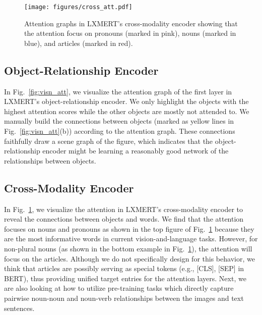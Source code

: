 \documentclass[11pt,a4paper]{article}
\begin{document}
\begin{figure}[t]
\centering
\texttt{[image: figures/cross\_att.pdf]}
\caption{
Attention graphs in LXMERT's cross-modality encoder showing that the attention focus on pronouns (marked in pink), nouns (marked in blue), and articles (marked in red). 
}
\vspace{-5pt}
\label{fig:cross_att}
\end{figure}

\subsection{Object-Relationship Encoder}
In Fig.~\ref{fig:visn_att}, we visualize the attention graph of the first layer in LXMERT's object-relationship encoder. 
We only highlight the objects with the highest attention scores while the other objects are mostly not attended to.
We manually build the connections between objects (marked as yellow lines in Fig.~\ref{fig:visn_att}(b)) according to the attention graph.
These connections faithfully draw a scene graph of the figure, which indicates that the object-relationship encoder might be learning a reasonably good network of the relationships between objects.

\subsection{Cross-Modality Encoder}
In Fig.~\ref{fig:cross_att}, we visualize the attention in LXMERT's cross-modality encoder to reveal the connections between objects and words. 
We find that the attention focuses on nouns and pronouns as shown in the top figure of Fig.~\ref{fig:cross_att} because they are the most informative words in current vision-and-language tasks.
However, for non-plural nouns (as shown in the bottom example in Fig.~\ref{fig:cross_att}), the attention will focus on the articles.
Although we do not specifically design for this behavior, we think that articles are possibly serving as special tokens (e.g., [CLS], [SEP] in BERT), thus providing unified target entries for the attention layers. Next, we are also looking at how to utilize pre-training tasks which directly capture pairwise noun-noun and noun-verb relationships between the images and text sentences.
 
\end{document}

